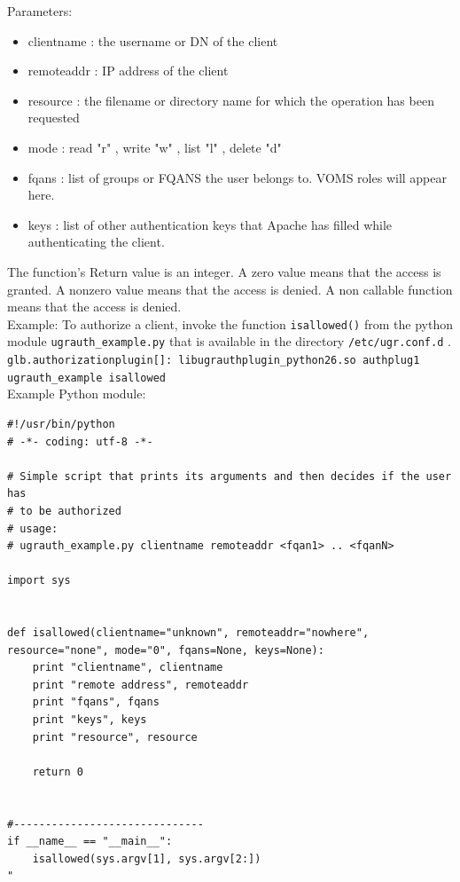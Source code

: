 \documentclass[12pt]{article} %
\begin{document}
Parameters:\\
\begin{itemize}
 \item clientname : the username or DN of the client
 \item remoteaddr : IP address of the client
 \item resource : the filename or directory name for which the operation has been requested
 \item mode : read "r" , write "w" , list "l" , delete "d"
 \item fqans : list of groups or FQANS the user belongs to. VOMS roles will appear here.
 \item keys : list of other authentication keys that Apache has filled while authenticating the client.
\end{itemize}

The function's Return value is an integer. A zero value means that the access is granted. A nonzero value means that the access is denied.
A non callable function means that the access is denied.\\

Example:
To authorize a client, invoke the function \lstinline"isallowed()" from the python module \lstinline"ugrauth_example.py" that is available in the directory \lstinline"/etc/ugr.conf.d" .\\
\lstinline"glb.authorizationplugin[]: libugrauthplugin_python26.so authplug1 ugrauth_example isallowed"\\

Example Python module:\\

\begin{lstlisting}
#!/usr/bin/python
# -*- coding: utf-8 -*-

# Simple script that prints its arguments and then decides if the user has
# to be authorized
# usage:
# ugrauth_example.py clientname remoteaddr <fqan1> .. <fqanN>

import sys


def isallowed(clientname="unknown", remoteaddr="nowhere", resource="none", mode="0", fqans=None, keys=None):
    print "clientname", clientname
    print "remote address", remoteaddr
    print "fqans", fqans
    print "keys", keys
    print "resource", resource

    return 0


#------------------------------
if __name__ == "__main__":
    isallowed(sys.argv[1], sys.argv[2:])
"
\end{lstlisting}
\end{document}
